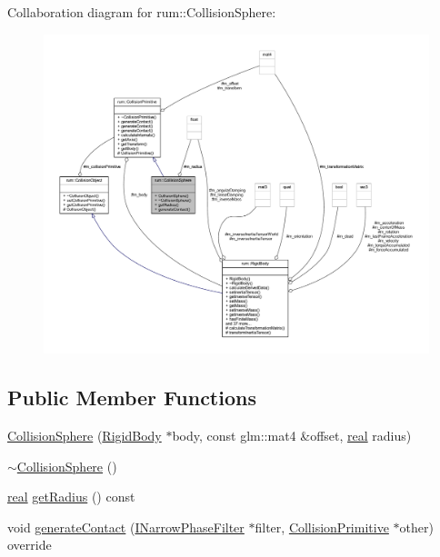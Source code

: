 Collaboration diagram for rum\+:\+:Collision\+Sphere\+:\nopagebreak
\begin{figure}[H]
\begin{center}
\leavevmode
\includegraphics[width=350pt]{classrum_1_1_collision_sphere__coll__graph}
\end{center}
\end{figure}
\subsection*{Public Member Functions}
\begin{DoxyCompactItemize}
\item 
\mbox{\hyperlink{classrum_1_1_collision_sphere_a5697b121eec9538a48cb6b42d10de9a0}{Collision\+Sphere}} (\mbox{\hyperlink{classrum_1_1_rigid_body}{Rigid\+Body}} $\ast$body, const glm\+::mat4 \&offset, \mbox{\hyperlink{namespacerum_a7e8cca23573d5eaead0f138cbaa4862c}{real}} radius)
\item 
\mbox{\hyperlink{classrum_1_1_collision_sphere_a6e3be5263f114a38ecb3bbf9b97ba8df}{$\sim$\+Collision\+Sphere}} ()
\item 
\mbox{\hyperlink{namespacerum_a7e8cca23573d5eaead0f138cbaa4862c}{real}} \mbox{\hyperlink{classrum_1_1_collision_sphere_a9d415d951f290a51180db6a79cdb0245}{get\+Radius}} () const
\item 
void \mbox{\hyperlink{classrum_1_1_collision_sphere_a4101051ee3213ce5257adcabd1529c00}{generate\+Contact}} (\mbox{\hyperlink{classrum_1_1_i_narrow_phase_filter}{I\+Narrow\+Phase\+Filter}} $\ast$filter, \mbox{\hyperlink{classrum_1_1_collision_primitive}{Collision\+Primitive}} $\ast$other) override
\end{DoxyCompactItemize}
